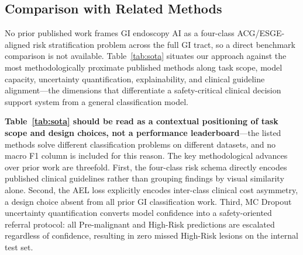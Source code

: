 \documentclass[11pt,a4paper]{article}
\begin{document}
\subsection{Comparison with Related Methods}

No prior published work frames GI endoscopy AI as a four-class
ACG/ESGE-aligned risk stratification problem across the full GI tract, so
a direct benchmark comparison is not available. Table~\ref{tab:sota}
situates our approach against the most methodologically proximate published
methods along task scope, model capacity, uncertainty quantification,
explainability, and clinical guideline alignment---the dimensions that
differentiate a safety-critical clinical decision support system from a
general classification model.

\begin{table}[H]
\centering
\caption{Comparison with representative GI endoscopy AI approaches.
  Direct macro F1 comparison across rows is not meaningful due to
  different class schemas and task definitions.
  UQ\,=\,uncertainty quantification; XAI\,=\,gradient-weighted explainability;
  $\dagger$\,=\,top-1 accuracy reported (task differs from ours).}
\label{tab:sota}
\end{table}

\textbf{Table~\ref{tab:sota} should be read as a contextual positioning of
task scope and design choices, not a performance leaderboard}---the listed
methods solve different classification problems on different datasets, and
no macro F1 column is included for this reason. The key methodological
advances over prior work are threefold. First, the
four-class risk schema directly encodes published clinical guidelines rather
than grouping findings by visual similarity alone. Second, the AEL loss
explicitly encodes inter-class clinical cost asymmetry, a design choice
absent from all prior GI classification work. Third, MC Dropout uncertainty
quantification converts model confidence into a safety-oriented referral
protocol: all Pre-malignant and High-Risk predictions are escalated regardless
of confidence, resulting in zero missed High-Risk lesions on the internal test set.
\end{document}
